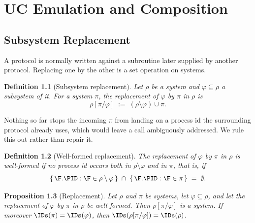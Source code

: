 \documentclass[10pt,oneside,openany]{book}
\theoremstyle{accentdef}
\newtheorem{definition}{Definition}[chapter]
\theoremstyle{accentplain}
\newtheorem{proposition}[definition]{Proposition}
\begin{document}

\chapter{UC Emulation and Composition}\label{sec:uc}

\section{Subsystem Replacement}\label{sec:repl}

A protocol is normally written against a subroutine later supplied by another protocol. Replacing
one by the other is a set operation on systems.

\begin{definition}[Subsystem replacement]\label{def:repl}
Let $\rho$ be a system and $\varphi \subseteq \rho$ a subsystem of it. For a system $\pi$, the
\emph{replacement of $\varphi$ by $\pi$ in $\rho$} is
\[
  \rho[\pi/\varphi] \;:=\; (\rho \setminus \varphi) \cup \pi .
\]
\end{definition}

Nothing so far stops the incoming $\pi$ from landing on a process id the surrounding protocol
already uses, which would leave a call ambiguously addressed. We rule this out rather than repair
it.

\begin{definition}[Well-formed replacement]\label{def:wf}
The replacement of $\varphi$ by $\pi$ in $\rho$ is \emph{well-formed} if no process id occurs
both in $\rho \setminus \varphi$ and in $\pi$, that is, if
\[
  \{\, \F.\PID : \F \in \rho \setminus \varphi \,\} \;\cap\; \{\, \F.\PID : \F \in \pi \,\} \;=\; \emptyset .
\]
\end{definition}

\begin{proposition}[Replacement]\label{prop:repl}
Let $\rho$ and $\pi$ be systems, let $\varphi \subseteq \rho$, and let the replacement of
$\varphi$ by $\pi$ in $\rho$ be
well-formed. Then $\rho[\pi/\varphi]$ is a system. If moreover $\IDs(\pi) = \IDs(\varphi)$, then
$\IDs(\rho[\pi/\varphi]) = \IDs(\rho)$.
\end{proposition}
\end{document}
